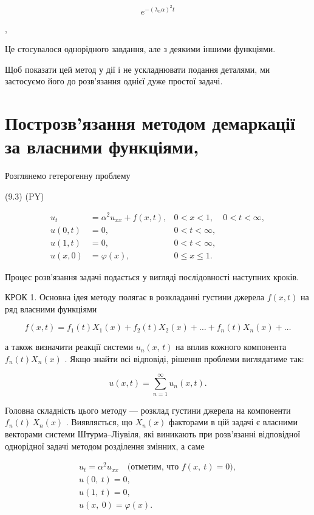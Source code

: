 \documentclass[
  ukrainian,
]{article}
\begin{document}
\[
e^{-(\lambda_n\alpha)^2 t}
\]

,

Це стосувалося однорідного завдання, але з деякими іншими функціями.

Щоб показати цей метод у дії і не ускладнювати подання деталями, ми
застосуємо його до розв'язання однієї дуже простої задачі.

\section{Построзв'язання методом демаркації за власними
функціями,}\label{ux43fux43eux441ux442ux440ux43eux437ux432ux44fux437ux430ux43dux43dux44f-ux43cux435ux442ux43eux434ux43eux43c-ux434ux435ux43cux430ux440ux43aux430ux446ux456ux457-ux437ux430-ux432ux43bux430ux441ux43dux438ux43cux438-ux444ux443ux43dux43aux446ux456ux44fux43cux438}

Розглянемо гетерогенну проблему

(9.3) (PY)

\[
\begin{aligned} u_t &= \alpha^2 u_{xx} + f(x, t), & 0 < x < 1, & 0 < t < \infty, \\ u(0, t) &= 0, & 0 < t < \infty, \\ u(1, t) &= 0, & 0 < t < \infty, \\ u(x, 0) &= \varphi(x), & 0 \leqslant x \leqslant 1. \end{aligned}
\]

Процес розв'язання задачі подається у вигляді послідовності наступних
кроків.

КРОК 1. Основна ідея методу полягає в розкладанні густини джерела
\(f(x, t)\) на ряд власними функціями

\[
f(x, t) = f_1(t) X_1(x) + f_2(t) X_2(x) + \dots + f_n(t) X_n(x) + \dots
\]

а також визначити реакції системи \(u_n\left(x,\,t\right)\) на вплив
кожного компонента \(f_n\left(t\right)X_n\left(x\right)\) . Якщо знайти
всі відповіді, рішення проблеми виглядатиме так:

\[
u(x, t) = \sum_{n=1}^{\infty} u_n(x, t).
\]

Головна складність цього методу --- розклад густини джерела на
компоненти \(f_n(t)\,X_n(x)\) . Виявляється, що \(X_n(x)\) факторами в
цій задачі є власними векторами системи Штурма--Ліувіля, які виникають
при розв'язанні відповідної однорідної задачі методом розділення
змінних, а саме

\[
\begin{array}{c} u_t = \alpha^2 u_{xx} \quad \text{(отметим, что } f(x, \ t) = 0), \\ u(0, \ t) = 0, \\ u(1, \ t) = 0, \\ u(x, \ 0) = \varphi(x). \end{array}
\]
\end{document}
